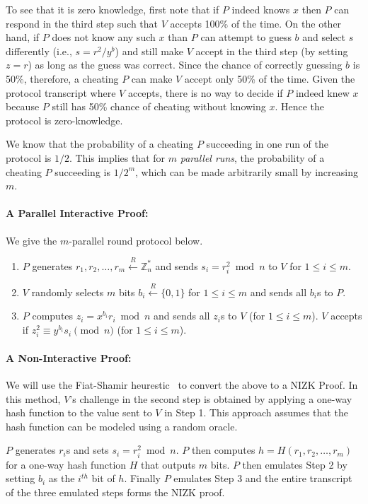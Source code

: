 \documentclass[]{report}   %
\newcommand{\rand}{\stackrel{R}{\leftarrow}}
\begin{document}
To see that it is zero knowledge, first note that if $P$ indeed knows $x$ then $P$ can respond in the third step such that $V$ accepts 100\% of the time. On the other hand, if $P$ does not know any such $x$ than $P$ can attempt to guess $b$ and select $s$ differently (i.e., $s=r^2/y^b$) and still make $V$ accept in the third step (by setting $z=r$) as long as the guess was correct. 
Since the chance of correctly guessing $b$ is 50\%, therefore, a cheating $P$ can make $V$ accept only 50\% of the time. 
Given the protocol transcript where $V$ accepts, there is no way to decide if $P$ indeed knew $x$ because $P$ still has 50\% chance of cheating without knowing $x$. Hence the protocol is zero-knowledge.

We know that the probability of a cheating $P$ succeeding in one run of the protocol is $1/2$. This implies that for $m$ {\em parallel runs}, the probability of a cheating $P$ succeeding is $1/2^m$, which can be made arbitrarily small by increasing $m$. 

\paragraph{A Parallel Interactive Proof:} We give the $m$-parallel round protocol below.

\begin{enumerate}
	\item $P$ generates $r_1, r_2, \ldots, r_m\rand \mathbb{Z}^*_n$ and sends $s_i = r_i^2\bmod{n}$ to $V$ for $1\leq i\leq m$.
	\item $V$ randomly selects $m$ bits $b_i\rand \{0, 1\}$  for $1\leq i\leq m$ and sends all $b_i$s to $P$.
	\item $P$ computes $z_i=x^{b_i}r_i \bmod{n}$ and sends all $z_i$s to $V$ (for $1\leq i\leq m$). $V$ accepts if $z_i^2 \equiv y^{b_i}s_i\pmod{n}$  (for $1\leq i\leq m$).
\end{enumerate}

\paragraph{A Non-Interactive Proof:} We will use the Fiat-Shamir heurestic~\cite{fiat1986prove} to convert the above to a NIZK Proof. In this method, $V$'s challenge in the second step is obtained by applying a  one-way hash function to the value sent to $V$ in Step 1. This approach assumes that the hash function can be modeled using a random oracle.

$P$ generates $r_i$s and sets $s_i = r_i^2\bmod{n}$. $P$ then computes $h = H(r_1, r_2, \ldots, r_m)$ for a one-way hash function $H$ that outputs $m$ bits. $P$ then emulates Step 2 by setting $b_i$ as the $i^{th}$ bit of $h$. Finally $P$ emulates Step 3 and the entire transcript of the three emulated steps forms the NIZK proof.
\end{document}
